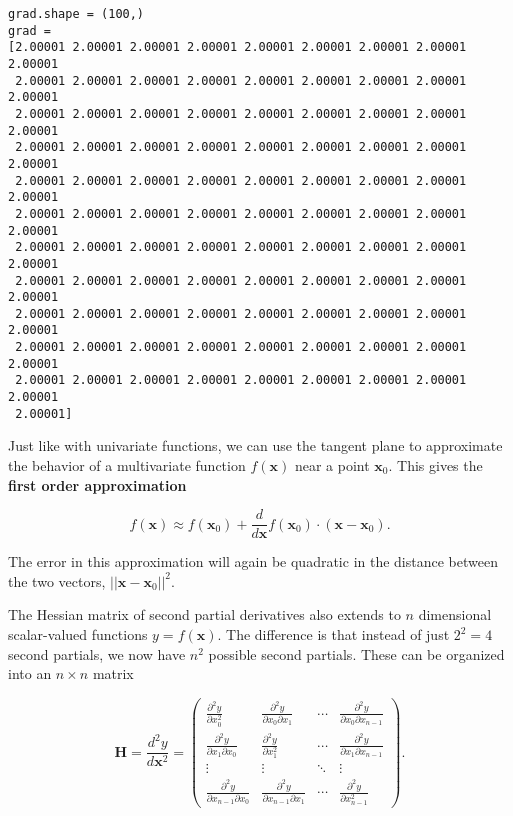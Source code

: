 \documentclass[
  letterpaper,
  DIV=11,
  numbers=noendperiod]{scrreprt}
\begin{document}
\begin{verbatim}
grad.shape = (100,)
grad = 
[2.00001 2.00001 2.00001 2.00001 2.00001 2.00001 2.00001 2.00001 2.00001
 2.00001 2.00001 2.00001 2.00001 2.00001 2.00001 2.00001 2.00001 2.00001
 2.00001 2.00001 2.00001 2.00001 2.00001 2.00001 2.00001 2.00001 2.00001
 2.00001 2.00001 2.00001 2.00001 2.00001 2.00001 2.00001 2.00001 2.00001
 2.00001 2.00001 2.00001 2.00001 2.00001 2.00001 2.00001 2.00001 2.00001
 2.00001 2.00001 2.00001 2.00001 2.00001 2.00001 2.00001 2.00001 2.00001
 2.00001 2.00001 2.00001 2.00001 2.00001 2.00001 2.00001 2.00001 2.00001
 2.00001 2.00001 2.00001 2.00001 2.00001 2.00001 2.00001 2.00001 2.00001
 2.00001 2.00001 2.00001 2.00001 2.00001 2.00001 2.00001 2.00001 2.00001
 2.00001 2.00001 2.00001 2.00001 2.00001 2.00001 2.00001 2.00001 2.00001
 2.00001 2.00001 2.00001 2.00001 2.00001 2.00001 2.00001 2.00001 2.00001
 2.00001]
\end{verbatim}

Just like with univariate functions, we can use the tangent plane to
approximate the behavior of a multivariate function \(f(\mathbf{x})\)
near a point \(\mathbf{x}_0\). This gives the \textbf{first order
approximation}

\[f(\mathbf{x}) \approx f(\mathbf{x}_0) + \frac{d}{d\mathbf{x}} f(\mathbf{x}_0) \cdot (\mathbf{x} - \mathbf{x}_0).\]

The error in this approximation will again be quadratic in the distance
between the two vectors, \(||\mathbf{x} - \mathbf{x}_0||^2\).

The Hessian matrix of second partial derivatives also extends to \(n\)
dimensional scalar-valued functions \(y = f(\mathbf{x})\). The
difference is that instead of just \(2^2=4\) second partials, we now
have \(n^2\) possible second partials. These can be organized into an
\(n \times n\) matrix

\[
\mathbf{H} = \frac{d^2 y}{d\mathbf{x}^2} = 
\begin{pmatrix} 
\frac{\partial^2 y}{\partial x_0^2} & \frac{\partial^2 y}{\partial x_0 \partial x_1} & \cdots & \frac{\partial^2 y}{\partial x_0 \partial x_{n-1}} \\ 
\frac{\partial^2 y}{\partial x_1 \partial x_0} & \frac{\partial^2 y}{\partial x_1^2} & \cdots & \frac{\partial^2 y}{\partial x_1 \partial x_{n-1}} \\ 
\vdots & \vdots & \ddots & \vdots \\
\frac{\partial^2 y}{\partial x_{n-1} \partial x_0} & \frac{\partial^2 y}{\partial x_{n-1} \partial x_1} & \cdots & \frac{\partial^2 y}{\partial x_{n-1}^2}
\end{pmatrix}.
\]
\end{document}
